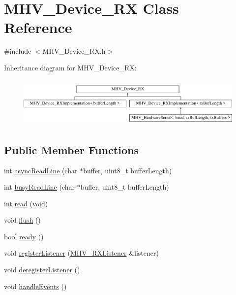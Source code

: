 \hypertarget{class_m_h_v___device___r_x}{\section{M\-H\-V\-\_\-\-Device\-\_\-\-R\-X Class Reference}
\label{class_m_h_v___device___r_x}
}


{\ttfamily \#include $<$M\-H\-V\-\_\-\-Device\-\_\-\-R\-X.\-h$>$}

Inheritance diagram for M\-H\-V\-\_\-\-Device\-\_\-\-R\-X\-:\begin{figure}[H]
\begin{center}
\leavevmode
\includegraphics[height=2.492581cm]{class_m_h_v___device___r_x}
\end{center}
\end{figure}
\subsection*{Public Member Functions}
\begin{DoxyCompactItemize}
\item 
int \hyperlink{class_m_h_v___device___r_x_ad8da50a37b9f5e84428ce7920f6c7153}{async\-Read\-Line} (char $\ast$buffer, uint8\-\_\-t buffer\-Length)
\item 
int \hyperlink{class_m_h_v___device___r_x_a872dd2a1c97d5e1bb962df0d93c7c3cc}{busy\-Read\-Line} (char $\ast$buffer, uint8\-\_\-t buffer\-Length)
\item 
int \hyperlink{class_m_h_v___device___r_x_a03301976a9e3f504bcdfd56607f03425}{read} (void)
\item 
void \hyperlink{class_m_h_v___device___r_x_a046e51e8d7b47e084fea8f2508e93ae9}{flush} ()
\item 
bool \hyperlink{class_m_h_v___device___r_x_a6d9d253544c30aff62bdcae14f9b2705}{ready} ()
\item 
void \hyperlink{class_m_h_v___device___r_x_a2797697f3b03274f06da79eb5c4e62be}{register\-Listener} (\hyperlink{class_m_h_v___r_x_listener}{M\-H\-V\-\_\-\-R\-X\-Listener} \&listener)
\item 
void \hyperlink{class_m_h_v___device___r_x_aeaeee691f88b5895a09afbb1c47d83d1}{deregister\-Listener} ()
\item 
void \hyperlink{class_m_h_v___device___r_x_a13adea72a323b7debc5985e5bba21e58}{handle\-Events} ()
\end{DoxyCompactItemize}
